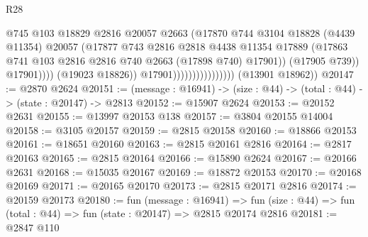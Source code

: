 \begin{lexlean}{R28}
\begin{coremodule}
                                                @745
                                                @103
                                                @18829
                                                @2816
                                                @20057
                                                @2663
                                                (@17870
                                                  @744
                                                  @3104
                                                  @18828
                                                  (@4439 @11354)
                                                  @20057
                                                  (@17877
                                                    @743
                                                    @2816
                                                    @2818
                                                    @4438
                                                    @11354
                                                    @17889
                                                    (@17863
                                                      @741
                                                      @103
                                                      @2816
                                                      @2816
                                                      @740
                                                      @2663
                                                      (@17898 @740)
                                                      @17901))
                                                  (@17905 @739))
                                                @17901))))
                                        (@19023 @18826))
                                      @17901))))))))))))))))
      (@13901 @18962))
@20147 := @2870 @2624
@20151 := (message : @16941) -> (size : @44) -> (total : @44) -> (state : @20147) -> @2813
@20152 := @15907 @2624
@20153 := @20152 @2631
@20155 := @13997 @20153 @138
@20157 := @3804 @20155 @14004
@20158 := @3105 @20157
@20159 := @2815 @20158
@20160 := @18866 @20153
@20161 := @18651 @20160
@20163 := @2815 @20161 @2816
@20164 := @2817 @20163
@20165 := @2815 @20164
@20166 := @15890 @2624
@20167 := @20166 @2631
@20168 := @15035 @20167
@20169 := @18872 @20153
@20170 := @20168 @20169
@20171 := @20165 @20170
@20173 := @2815 @20171 @2816
@20174 := @20159 @20173
@20180 := fun (message : @16941) =>
  fun (size : @44) => fun (total : @44) => fun (state : @20147) => @2815 @20174 @2816
@20181 := @2847 @110

\end{coremodule}
\end{lexlean}
